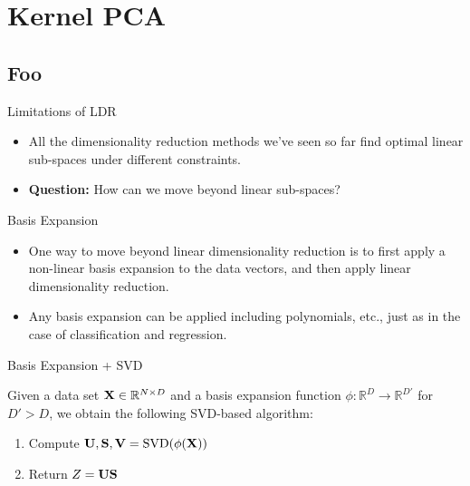 \documentclass[serif,xcolor=pdftex,dvipsnames,table,hyperref={bookmarks=false,breaklinks}]{beamer}
\begin{document}
\maketitlepage


\section{Kernel PCA}
\subsection{Foo}

\begin{frame}[t]{Limitations of LDR}

\begin{itemize}
\item All the dimensionality reduction methods we've seen so far find optimal
linear sub-spaces under different constraints.

\pause\item \textbf{Question:} How can we move beyond linear sub-spaces?
\end{itemize} 
\end{frame}

\begin{frame}[t]{Basis Expansion}

\begin{itemize}
\item One way to move beyond linear dimensionality reduction is to first apply 
a non-linear basis expansion to the data vectors, and then apply linear 
dimensionality reduction.
 
\pause\item Any basis expansion can be applied including polynomials, etc., 
just as in the case of classification and regression.
 
\end{itemize} 
\end{frame}

\begin{frame}[t]{Basis Expansion + SVD}

Given a data set ${\mathbf{X}}\in\mathbb{R}^{N\times D}$ and a basis expansion 
function $\phi: \mathbb{R}^D \rightarrow \mathbb{R}^{D'}$ for $D'>D$, we obtain 
the following SVD-based algorithm:

\begin{enumerate}
 \pause \item Compute ${\mathbf{U}},{\mathbf{S}},{\mathbf{V}} = \mbox{SVD}(\phi({\mathbf{X}}))$
 \pause \item Return $Z = {\mathbf{U}}{\mathbf{S}}$
\end{enumerate} 
\end{frame}
\end{document}
